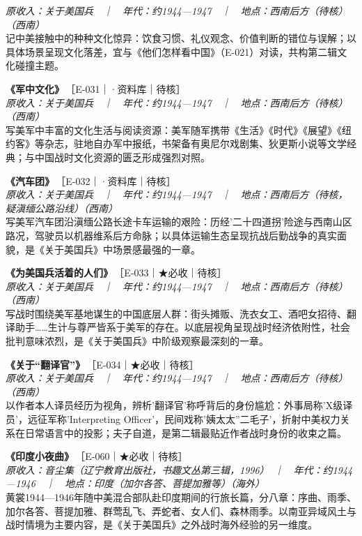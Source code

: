 \documentclass[UTF8,fontset=none,zihao=-4,a4paper]{ctexart}
\begin{document}
{\small\itshape 原收入：关于美国兵　｜　年代：约1944—1947　｜　地点：西南后方（待核）（西南）}\\
记中美接触中的种种文化惊异：饮食习惯、礼仪观念、价值判断的错位与误解；以具体场景呈现文化落差，宜与《他们怎样看中国》（E-021）对读，共构第二辑文化碰撞主题。
\par\vspace{5pt}
\noindent\textbf{《军中文化》}\,{\small ［E-031｜·资料库｜待核］}\\
{\small\itshape 原收入：关于美国兵　｜　年代：约1944—1947　｜　地点：西南后方（待核）（西南）}\\
写美军中丰富的文化生活与阅读资源：美军随军携带《生活》《时代》《展望》《纽约客》等杂志，驻地自办军中报纸，书架备有奥尼尔戏剧集、狄更斯小说等文学经典；与中国战时文化资源的匮乏形成强烈对照。
\par\vspace{5pt}
\noindent\textbf{《汽车团》}\,{\small ［E-032｜·资料库｜待核］}\\
{\small\itshape 原收入：关于美国兵　｜　年代：约1944—1947　｜　地点：西南后方（待核，疑滇缅公路沿线）（西南）}\\
写美军汽车团沿滇缅公路长途卡车运输的艰险：历经'二十四道拐'险途与西南山区路况，驾驶员以机器维系后方命脉；以具体运输生态呈现抗战后勤战争的真实面貌，是《关于美国兵》中场景感最强的一章。
\par\vspace{5pt}
\noindent\textbf{《为美国兵活着的人们》}\,{\small ［E-033｜★必收｜待核］}\\
{\small\itshape 原收入：关于美国兵　｜　年代：约1944—1947　｜　地点：西南后方（待核）（西南）}\\
写战时围绕美军基地谋生的中国底层人群：街头摊贩、洗衣女工、酒吧女招待、翻译助手……生计与尊严皆系于美军的存在。以底层视角呈现战时经济依附性，社会批判意味浓烈，是《关于美国兵》中阶级观察最深刻的一章。
\par\vspace{5pt}
\noindent\textbf{《关于“翻译官”》}\,{\small ［E-034｜★必收｜待核］}\\
{\small\itshape 原收入：关于美国兵　｜　年代：约1944—1947　｜　地点：西南后方（待核）（西南）}\\
以作者本人译员经历为视角，辨析'翻译官'称呼背后的身份尴尬：外事局称'X级译员'，远征军称'Interpreting Officer'，民间戏称'姨太太''二毛子'，折射中美权力关系在日常语言中的投影；夫子自道，是第二辑最贴近作者战时身份的收束之篇。
\par\vspace{5pt}
\noindent\textbf{《印度小夜曲》}\,{\small ［E-060｜★必收｜待核］}\\
{\small\itshape 原收入：音尘集（辽宁教育出版社，书趣文丛第三辑，1996）　｜　年代：约1944—1946　｜　地点：印度（加尔各答、菩提加雅等）（海外）}\\
黄裳1944—1946年随中美混合部队赴印度期间的行旅长篇，分八章：序曲、雨季、加尔各答、菩提加雅、群莺乱飞、弄蛇者、女人们、森林雨季。以南亚异域风土与战时情境为主要内容，是《关于美国兵》之外战时海外经验的另一维度。
\par\vspace{5pt}
\end{document}
